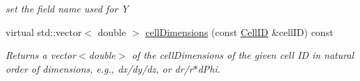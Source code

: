 \begin{DoxyCompactItemize}
\begin{DoxyCompactList}\small\item\em set the field name used for Y \item\end{DoxyCompactList}\item 
virtual std::vector$<$ double $>$ \hyperlink{class_d_d4hep_1_1_d_d_segmentation_1_1_cartesian_grid_x_y_a34189fa472ffda38fc7d865df8412ba0}{cellDimensions} (const \hyperlink{namespace_d_d4hep_1_1_d_d_segmentation_ac7af071d85cb48820914434a07e21ba1}{CellID} \&cellID) const 
\begin{DoxyCompactList}\small\item\em Returns a vector$<$double$>$ of the cellDimensions of the given cell ID in natural order of dimensions, e.g., dx/dy/dz, or dr/r$\ast$dPhi. \item\end{DoxyCompactList}\end{DoxyCompactItemize}
